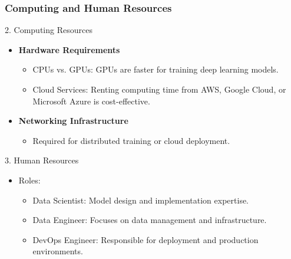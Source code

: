 \documentclass[aspectratio=169]{beamer}
\begin{document}
\begin{frame}[fragile]
    \frametitle{Computing and Human Resources}
    \begin{block}{2. Computing Resources}
        \begin{itemize}
            \item \textbf{Hardware Requirements}
                \begin{itemize}
                    \item CPUs vs. GPUs: GPUs are faster for training deep learning models.
                    \item Cloud Services: Renting computing time from AWS, Google Cloud, or Microsoft Azure is cost-effective.
                \end{itemize}
            \item \textbf{Networking Infrastructure}
                \begin{itemize}
                    \item Required for distributed training or cloud deployment.
                \end{itemize}
        \end{itemize}
    \end{block}
    
    \begin{block}{3. Human Resources}
        \begin{itemize}
            \item Roles:
                \begin{itemize}
                    \item Data Scientist: Model design and implementation expertise.
                    \item Data Engineer: Focuses on data management and infrastructure.
                    \item DevOps Engineer: Responsible for deployment and production environments.
                \end{itemize}
        \end{itemize}
    \end{block}
\end{frame}
\end{document}
